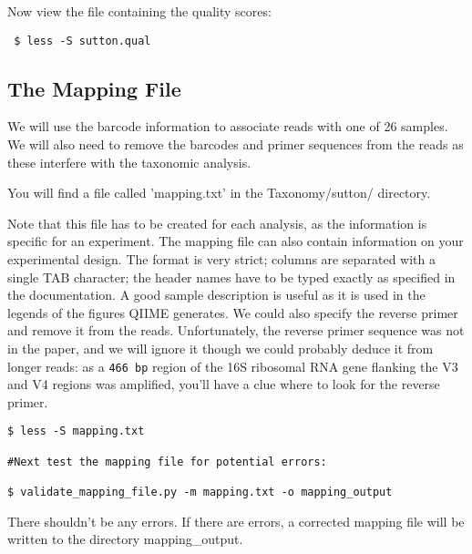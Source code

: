 \documentclass[a4paper,12pt,twoside]{memoir}
\begin{document}
\begin{steps}
Now view the file containing the quality scores:
\begin{lstlisting}
 $ less -S sutton.qual
\end{lstlisting}
\end{steps}

\subsection{The Mapping File} 

\begin{information}
We will use the barcode information to associate reads with one of 26 samples. We will also need to remove the barcodes and primer sequences from the reads as these interfere with the taxonomic analysis. 

You will find a file called 'mapping.txt' in the Taxonomy/sutton/ directory. 

Note that this file has to be created for each analysis, as the information is specific for an experiment. The mapping file can also contain information on your experimental design. The format is very strict; columns are separated with a single TAB character; the header names have to be typed exactly as specified in the documentation. A good sample description is useful as it is used in the legends of the figures QIIME generates. We could also specify the reverse primer and remove it from the reads. 
Unfortunately, the reverse primer sequence was not in the paper, and we will ignore it though we could probably deduce it from longer reads: as a \texttt{466 bp} region of the 16S ribosomal RNA gene flanking the V3 and V4 regions was amplified, you'll have a clue where to look for the reverse primer.
\end{information}

\begin{steps}
\begin{lstlisting}
$ less -S mapping.txt

#Next test the mapping file for potential errors:

$ validate_mapping_file.py -m mapping.txt -o mapping_output
\end{lstlisting}
\end{steps}

\begin{information}
There shouldn't be any errors. If there are errors, a corrected mapping file will be written to the directory mapping\_output.
\end{information}
\end{document}
